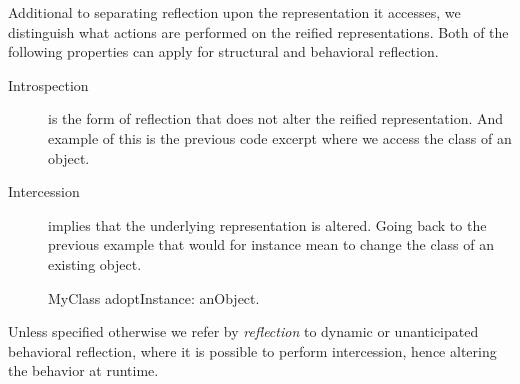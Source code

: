 Additional to separating reflection upon the representation it accesses, we distinguish what actions are performed on the reified representations.
Both of the following properties can apply for structural and behavioral reflection.
%
\begin{description}
\item[Introspection] is the form of reflection that does not alter the reified 	representation.
And example of this is the previous code excerpt where we access the class of an object.
	
\item[Intercession] implies that the underlying representation is altered.
Going back to the previous example that would for instance mean to change the class of an existing object.
\begin{stcode}{}
MyClass adoptInstance: anObject.
\end{stcode}
\end{description}
%

\noindent Unless specified otherwise we refer by \emph{reflection} to dynamic or unanticipated behavioral reflection, where it is possible to perform intercession, hence altering the behavior at runtime.

